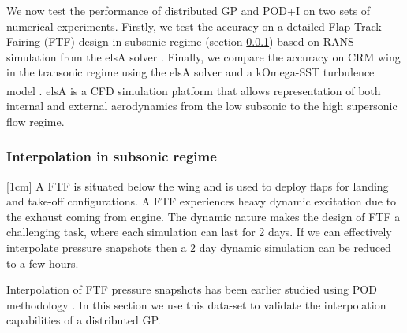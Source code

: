We now test the performance of distributed GP and POD+I on two sets of numerical experiments. Firstly, we test the accuracy on a detailed Flap Track Fairing (FTF) design \cite{bosco2016nonlinear} in subsonic regime (section \ref{subSec:elsAResults}) based on RANS simulation from the elsA solver \cite{cambier2008status}. Finally, we compare the accuracy on CRM wing in the transonic regime using the elsA solver and a kOmega-SST turbulence model \cite{vassberg2014summary}. elsA\textsuperscript{\textregistered} \cite{cambier2008status} is a CFD simulation platform that allows representation of both internal and external aerodynamics from the low subsonic to the high supersonic flow regime.  

\subsubsection{Interpolation in subsonic regime}\label{subSec:elsAResults}
[1cm]
A FTF is situated below the wing and is used to deploy flaps for landing and take-off configurations. A FTF experiences heavy dynamic excitation due to the exhaust coming from engine. The dynamic nature makes the design of FTF a challenging task, where each simulation can last for 2 days. If we can effectively interpolate pressure snapshots then a 2 day dynamic simulation can be reduced to a few hours. 

Interpolation of FTF pressure snapshots has been earlier studied using POD methodology \cite{bosco2016nonlinear}. In this section we use this data-set to validate the interpolation capabilities of a distributed GP. 


